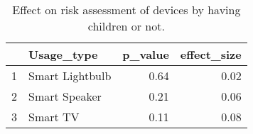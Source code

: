 \begin{table}[ht]
\centering
\begin{tabular}{rlrr}
  \hline
 & Usage\_type & p\_value & effect\_size \\ 
  \hline
1 & Smart Lightbulb & 0.64 & 0.02 \\ 
  2 & Smart Speaker & 0.21 & 0.06 \\ 
  3 & Smart TV & 0.11 & 0.08 \\ 
   \hline
\end{tabular}
\caption{Effect on risk assessment of devices by having children or not.} 
\end{table}

